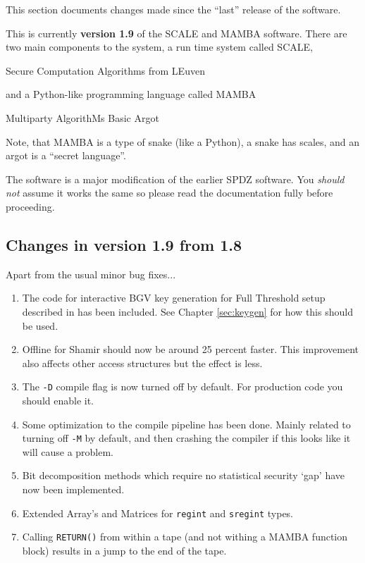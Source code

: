 
This section documents changes made since the ``last'' release of
the software.

\vspace{5mm}

\noindent
This is currently {\bf version 1.9} of the SCALE and MAMBA software.
There are two main components to the system, a run time system called
SCALE,
\begin{center}
  Secure Computation Algorithms from LEuven
\end{center}
and a Python-like programming language called MAMBA
\begin{center}
  Multiparty AlgorithMs Basic Argot
\end{center}
Note, that MAMBA is a type of snake (like a Python), a snake
has scales, and an argot is a ``secret language''.

\vspace{5mm}

\noindent
The software is a major modification of the earlier SPDZ software.
You {\em should not} assume it works the same so please read
the documentation fully before proceeding.

\subsection{Changes in version 1.9 from 1.8}
Apart from the usual minor bug fixes...
\begin{enumerate}
\item The code for interactive BGV key generation for Full Threshold
        setup described in \cite{SPDZKG} has been included.
      See Chapter \ref{sec:keygen} for how this should be used.
\item Offline for Shamir should now be around 25 percent faster.
This improvement also affects other access structures but the effect
is less.
\item The \verb+-D+ compile flag is now turned off by default.
For production code you should enable it.
\item Some optimization to the compile pipeline has been done.
Mainly related to turning off \verb+-M+ by default,
and then crashing the compiler if this looks like
it will cause a problem.
\item Bit decomposition methods which require no statistical
security `gap' have now been implemented.
\item Extended Array's and Matrices for \verb+regint+ and \verb+sregint+ types.\
\item Calling \verb+RETURN()+ from within a tape (and not withing a MAMBA function block) results in a jump to the end of the tape.
\end{enumerate}

